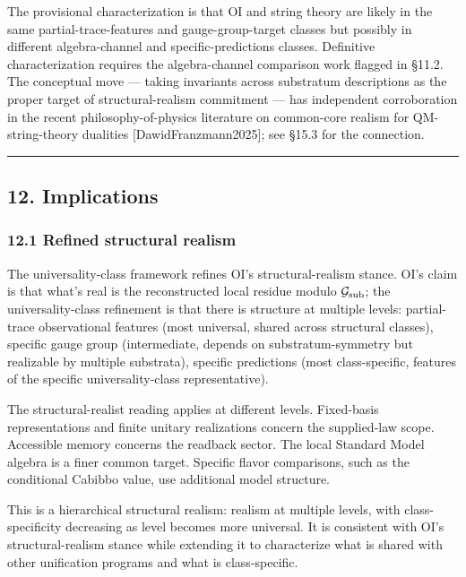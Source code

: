 \documentclass[
]{article}
\begin{document}
The provisional characterization is that OI and string theory are likely
in the same partial-trace-features and gauge-group-target classes but
possibly in different algebra-channel and specific-predictions classes.
Definitive characterization requires the algebra-channel comparison work
flagged in §11.2. The conceptual move --- taking invariants across
substratum descriptions as the proper target of structural-realism
commitment --- has independent corroboration in the recent
philosophy-of-physics literature on common-core realism for
QM-string-theory dualities {[}DawidFranzmann2025{]}; see §15.3 for the
connection.

\begin{center}\rule{0.5\linewidth}{0.5pt}\end{center}

\hypertarget{implications}{%
\subsection{12. Implications}\label{implications}}

\hypertarget{refined-structural-realism}{%
\subsubsection{12.1 Refined structural
realism}\label{refined-structural-realism}}

The universality-class framework refines OI's structural-realism stance.
OI's claim is that what's real is the reconstructed local residue modulo
\(\mathcal{G}_{\rm sub}\); the universality-class refinement is that
there is structure at multiple levels: partial-trace observational
features (most universal, shared across structural classes), specific
gauge group (intermediate, depends on substratum-symmetry but realizable
by multiple substrata), specific predictions (most class-specific,
features of the specific universality-class representative).

The structural-realist reading applies at different levels. Fixed-basis
representations and finite unitary realizations concern the supplied-law
scope. Accessible memory concerns the readback sector. The local
Standard Model algebra is a finer common target. Specific flavor
comparisons, such as the conditional Cabibbo value, use additional model
structure.

This is a hierarchical structural realism: realism at multiple levels,
with class-specificity decreasing as level becomes more universal. It is
consistent with OI's structural-realism stance while extending it to
characterize what is shared with other unification programs and what is
class-specific.
\end{document}

